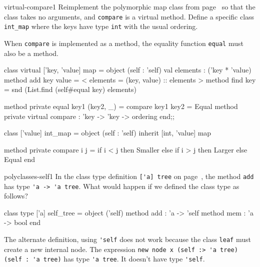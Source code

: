 
\begin{exercise}{virtual-compare1}
Reimplement the polymorphic map class from page~\pageref{page:poly-map}
so that the class takes no arguments, and \hbox{\lstinline$compare$} is a
virtual method.  Define a specific class \hbox{\lstinline$int_map$} where
the keys have type \hbox{\lstinline$int$} with the usual ordering.

\begin{answer}\ifanswers
When \hbox{\lstinline$compare$} is implemented as a method, the equality
function \hbox{\lstinline$equal$} must also be a method.  

\begin{ocaml}
class virtual ['key, 'value] map =
  object (self : 'self)
    val elements : ('key * 'value)
    method add key value = {< elements = (key, value) :: elements >}
    method find key = snd (List.find (self#equal key) elements)

    method private equal key1 (key2, _) = compare key1 key2 = Equal
    method private virtual compare : 'key -> 'key -> ordering
  end;;

class ['value] int_map =
  object (self : 'self)
    inherit [int, 'value] map

    method private compare i j =
      if i < j then Smaller
      else if i > j then Larger
      else Equal
  end
\end{ocaml}
\fi\end{answer}
\end{exercise}


\begin{exercise}{polyclasses-self1}
In the class type definition \hbox{\lstinline$['a] tree$} on
page~\pageref{page:poly-tree}, the method \hbox{\lstinline$add$} has
type \hbox{\lstinline$'a -> 'a tree$}.  What would happen if we defined the
class type as follows?

\begin{ocaml}
class type ['a] self_tree =
  object ('self)
    method add : 'a -> 'self
    method mem : 'a -> bool
  end
\end{ocaml}

\begin{answer}\ifanswers
The alternate definition, using \hbox{\lstinline$'self$} does not work because
the class \hbox{\lstinline$leaf$} must create a new internal node.  The expression
\hbox{\lstinline$new node x (self :> 'a tree) (self : 'a tree)$} has type
\hbox{\lstinline$'a tree$}.  It doesn't have type \hbox{\lstinline$'self$}.
\fi\end{answer}
\end{exercise}

